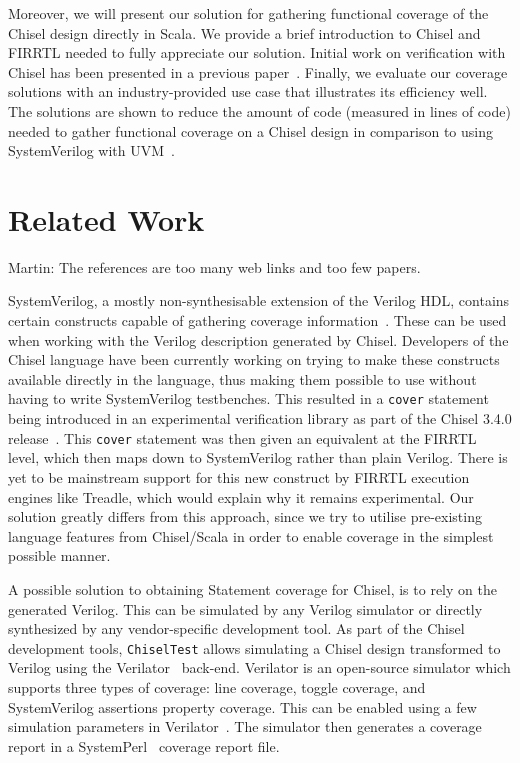 \documentclass[conference]{IEEEtran}
\newcommand{\martin}[1]{{\color{blue} Martin: #1}}
\begin{document}
Moreover, we will present our solution for gathering functional coverage of the Chisel design directly in Scala. We provide a brief introduction to Chisel and FIRRTL needed to fully appreciate our solution. Initial work on verification with Chisel has been presented in a previous paper~\cite{blind}. %
Finally, we evaluate our coverage solutions with an industry-provided use case that illustrates its efficiency well. The solutions are shown to reduce the amount of code (measured in lines of code) needed to gather functional coverage on a Chisel design in comparison to using SystemVerilog with UVM~\cite{uvm2015}.

\section{Related Work}

\martin{The references are too many web links and too few papers.}

SystemVerilog, a mostly non-synthesisable extension of the Verilog HDL, contains certain constructs capable of gathering coverage information~\cite{spear2008systemverilog}. These can be used when working with the Verilog description generated by Chisel. Developers of the Chisel language have been currently working on trying to make these constructs available directly in the language, thus making them possible to use without having to write SystemVerilog testbenches. This resulted in a \texttt{cover} statement being introduced in an experimental verification library as part of the Chisel 3.4.0 release~\cite{chisel3.4release_notes}. This \texttt{cover} statement was then given an equivalent at the FIRRTL level, which then maps down to SystemVerilog rather than plain Verilog. There is yet to be mainstream support for this new construct by FIRRTL execution engines like Treadle, which would explain why it remains experimental. Our solution greatly differs from this approach, since we try to utilise pre-existing language features from Chisel/Scala in order to enable coverage in the simplest possible manner.   
  
A possible solution to obtaining Statement coverage for Chisel, is to rely on the generated Verilog. 
This can be simulated by any Verilog simulator or directly synthesized by any vendor-specific development tool. 
As part of the Chisel development tools, \texttt{ChiselTest} allows simulating a Chisel design transformed to Verilog using the Verilator~\cite{verilator} back-end.
Verilator is an open-source simulator which supports three types of coverage: line coverage, toggle coverage, and SystemVerilog assertions property coverage. 
This can be enabled using a few simulation parameters in Verilator~\cite{tolotto2020}.
The simulator then generates a coverage report in a SystemPerl~\cite{SystemPerl} coverage report file.
\end{document}
